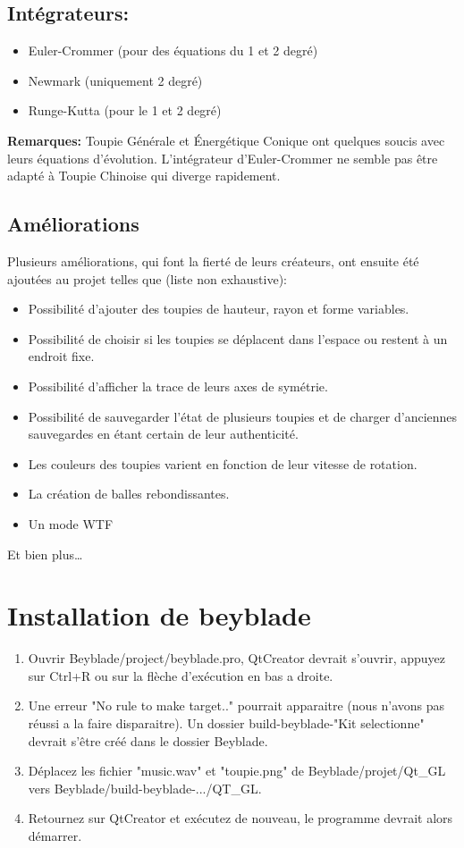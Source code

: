 \documentclass[a4paper]{article}%
\begin{document}
	\subsection {Intégrateurs:}
		\begin {itemize} 
			\item Euler-Crommer (pour des équations du 1\ier{} et 2\ieme{} degré)
			\item Newmark (uniquement 2\ieme{} degré)
			\item Runge-Kutta (pour le 1\ier{} et 2\ieme{} degré)
		\end {itemize} 
	\textbf {Remarques: }Toupie Générale et Énergétique Conique ont quelques soucis avec leurs équations d'évolution. L'intégrateur d'Euler-Crommer ne semble pas être adapté à Toupie Chinoise qui diverge rapidement. 
		
	\subsection {Améliorations}
		Plusieurs améliorations, qui font la fierté de leurs créateurs, ont ensuite été ajoutées au projet telles que (liste non exhaustive):
	
		\begin {itemize}
			\item Possibilité d'ajouter des toupies de hauteur, rayon et forme variables.
			\item Possibilité de choisir si les toupies se déplacent dans l'espace ou restent à un endroit fixe. 
			\item Possibilité d'afficher la trace de leurs axes de symétrie. 
			\item Possibilité de sauvegarder l'état de plusieurs toupies et de charger d'anciennes sauvegardes en étant certain de leur authenticité.
			\item Les couleurs des toupies varient en fonction de leur vitesse de rotation.
			\item La création de balles rebondissantes.
			\item Un mode WTF 
		\end {itemize}
		Et bien plus…

\section{Installation de beyblade}
	\begin {enumerate} 
		\item Ouvrir Beyblade/project/beyblade.pro, QtCreator devrait s'ouvrir, appuyez sur Ctrl+R ou sur la flèche d'exécution en bas a droite.
		\item Une erreur "No rule to make target.." pourrait apparaitre (nous n'avons pas réussi a la faire disparaitre). Un dossier build-beyblade-"Kit selectionne" devrait s'être créé dans le dossier Beyblade.
		\item Déplacez les fichier "music.wav" et "toupie.png" de Beyblade/projet/Qt\_GL vers Beyblade/build-beyblade-.../QT\_GL. 
		\item Retournez sur QtCreator et exécutez de nouveau, le programme devrait alors démarrer.
	\end {enumerate}
\end{document}
